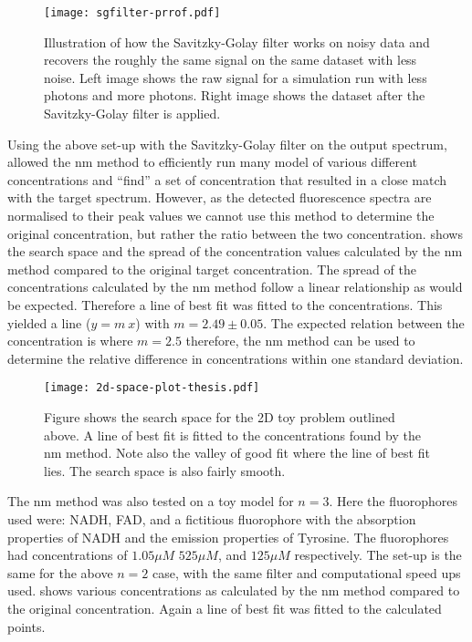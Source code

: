 \begin{figure}[!htbp]
  \centering
  \texttt{[image: sgfilter-prrof.pdf]}
  \caption{Illustration of how the Savitzky-Golay filter works on noisy data and recovers the roughly the same signal on the same dataset with less noise. Left image shows the raw signal for a simulation run with less photons and more photons. Right image shows the dataset after the Savitzky-Golay filter is applied.}
  \label{fig:sgfilter}
\end{figure}


Using the above set-up with the Savitzky-Golay filter on the output spectrum, allowed the \gls*{nm} method to efficiently run many model of various different concentrations and ``find'' a set of concentration that resulted in a close match with the target spectrum.
However, as the detected fluorescence spectra are normalised to their peak values we cannot use this method to determine the original concentration, but rather the ratio between the two concentration.
 shows the search space and the spread of the concentration values calculated by the \gls{nm} method compared to the original target concentration.
The spread of the concentrations calculated by the \gls*{nm} method follow a linear relationship as would be expected.
Therefore a line of best fit was fitted to the concentrations.
This yielded a line ($y=m\ x$) with $m=2.49\pm0.05$.
The expected relation between the concentration is where $m =2.5$ therefore, the \gls{nm} method can be used to determine the relative difference in concentrations within one standard deviation.


\begin{figure}[!htpb]
  \centering
  \texttt{[image: 2d-space-plot-thesis.pdf]}
  \caption{Figure shows the search space for the 2D toy problem outlined above. A line of best fit is fitted to the concentrations found by the \gls*{nm} method. Note also the valley of good fit where the line of best fit lies. The search space is also fairly smooth.}
  \label{fig:spaceplot2D}
\end{figure}


The \gls*{nm} method was also tested on a toy model for $n=3$.
Here the fluorophores used were: NADH, FAD, and a fictitious fluorophore with the absorption properties of NADH and the emission properties of Tyrosine.
The fluorophores had concentrations of $1.05\mu M$ $525\mu M$, and $125\mu M$ respectively.
The set-up is the same for the above $n=2$ case, with the same filter and computational speed ups used.
 shows various concentrations as calculated by the \gls*{nm} method compared to the original concentration.
Again a line of best fit was fitted to the calculated points.

